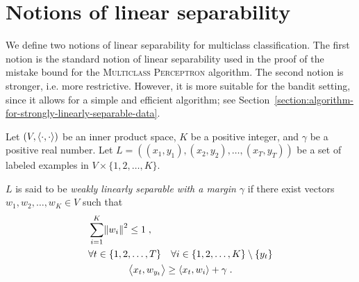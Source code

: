\section{Notions of linear separability}
\label{section:notions-of-linear-separability}

We define two notions of linear separability for multiclass classification. The
first notion is the standard notion of linear separability used in the proof of
the mistake bound for the \textsc{Multiclass Perceptron} algorithm. The second
notion is stronger, i.e. more restrictive. However, it is more suitable for the
bandit setting, since it allows for a simple and efficient algorithm; see
Section~\ref{section:algorithm-for-strongly-linearly-separable-data}.

\begin{definition}
\label{definition:weak-linear-separability}
Let $(V,\left\langle \cdot, \cdot \right\rangle)$ be an inner product space, $K$ be a positive
integer, and $\gamma$ be a positive real number. Let $L = ((x_1, y_1), (x_2,
y_2), \dots, (x_T, y_T))$ be a set of labeled examples in $V \times \{1,2,\dots,K\}$.

$L$ is said to be \emph{weakly linearly separable with a
margin $\gamma$} if there exist vectors $w_1, w_2, \dots, w_K \in V$ such
that
\begin{align}
\label{equation:weak-linear-separability-1}
& \sum_{i=1}^K \norm{w_i}^2 \le 1 \; , \\
\label{equation:weak-linear-separability-2}
& \begin{gathered}
\forall t \in \{1,2,\dots,T\} \quad \forall i \in \{1,2,\dots, K\} \setminus \{y_t\} \\
\left\langle x_t, w_{y_t} \right\rangle \ge \left\langle x_t, w_i \right\rangle + \gamma \; .
\end{gathered}
\end{align}
\end{definition}

